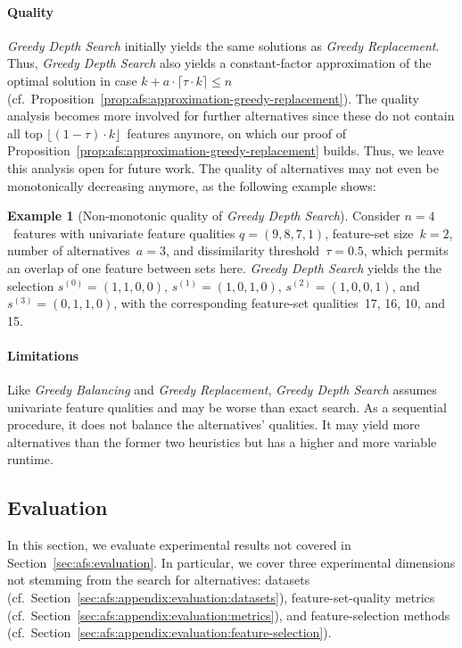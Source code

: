 \documentclass{article}
\theoremstyle{definition}
\newtheorem{example}{Example}
\begin{document}
\paragraph{Quality}

\emph{Greedy Depth Search} initially yields the same solutions as \emph{Greedy Replacement}.
Thus, \emph{Greedy Depth Search} also yields a constant-factor approximation of the optimal solution in case $k + a \cdot \lceil \tau \cdot k \rceil \leq n$ (cf.~Proposition~\ref{prop:afs:approximation-greedy-replacement}).
The quality analysis becomes more involved for further alternatives since these do not contain all top $\lfloor (1 - \tau) \cdot k \rfloor$~features anymore, on which our proof of Proposition~\ref{prop:afs:approximation-greedy-replacement} builds.
Thus, we leave this analysis open for future work.
The quality of alternatives may not even be monotonically decreasing anymore, as the following example shows:
%
\begin{example}[Non-monotonic quality of \emph{Greedy Depth Search}]
	Consider $n=4$~features with univariate feature qualities $q = (9,8,7,1)$, feature-set size~$k=2$, number of alternatives~$a=3$, and dissimilarity threshold~$\tau = 0.5$, which permits an overlap of one feature between sets here.
	\emph{Greedy Depth Search} yields the the selection $s^{(0)} = (1,1,0,0)$, $s^{(1)} = (1,0,1,0)$, $s^{(2)} = (1,0,0,1)$, and $s^{(3)} = (0,1,1,0)$, with the corresponding feature-set qualities~17, 16, 10, and 15.
	\label{ex:afs:greedy-depth:non-monotonic}
\end{example}

\paragraph{Limitations}

Like \emph{Greedy Balancing} and \emph{Greedy Replacement}, \emph{Greedy Depth Search} assumes univariate feature qualities and may be worse than exact search.
As a sequential procedure, it does not balance the alternatives' qualities.
It may yield more alternatives than the former two heuristics but has a higher and more variable runtime.

\subsection{Evaluation}
\label{sec:afs:appendix:evaluation}

In this section, we evaluate experimental results not covered in Section~\ref{sec:afs:evaluation}.
In particular, we cover three experimental dimensions not stemming from the search for alternatives:
datasets (cf.~Section~\ref{sec:afs:appendix:evaluation:datasets}), feature-set-quality metrics (cf.~Section~\ref{sec:afs:appendix:evaluation:metrics}), and feature-selection methods (cf.~Section~\ref{sec:afs:appendix:evaluation:feature-selection}).
\end{document}
